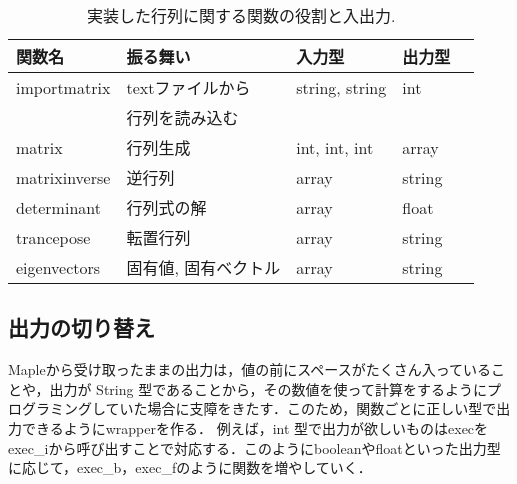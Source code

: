 \begin{table}[htbp]\begin{center}
\caption{実装した行列に関する関数の役割と入出力.}
\label{table:two}
\begin{tabular}{lllll}
\hline
関数名  &振る舞い  &入力型  &出力型  \\ \hline
importmatrix  &textファイルから  &string, string  &int  \\
 &行列を読み込む  & \\
matrix  &行列生成  &int, int, int  &array  \\
matrixinverse  &逆行列  &array  &string  \\
determinant  &行列式の解  &array  &float  \\
trancepose  &転置行列  &array  &string  \\
eigenvectors  &固有値, 固有ベクトル  &array  &string  \\
\hline
\end{tabular}
\label{default}
\end{center}\end{table}

\newpage

\subsection{出力の切り替え}
Mapleから受け取ったままの出力は，値の前にスペースがたくさん入っていることや，出力が String 型であることから，その数値を使って計算をするようにプログラミングしていた場合に支障をきたす．このため，関数ごとに正しい型で出力できるようにwrapperを作る．
例えば，int 型で出力が欲しいものはexecをexec\_iから呼び出すことで対応する．このようにbooleanやfloatといった出力型に応じて，exec\_b，exec\_fのように関数を増やしていく．

